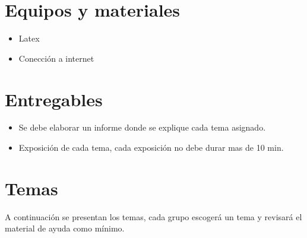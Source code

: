 \documentclass{article}
\begin{document}
	\section{Equipos y materiales}
	\begin{itemize}
		\item Latex
		\item Conección a internet 
	\end{itemize}
	
	\section{Entregables}
	\begin{itemize}
		\item Se debe elaborar un informe donde se explique cada tema asignado.
		\item Exposición de cada tema, cada exposición no debe durar mas de 10 min.
	\end{itemize}
	
	
	
	
	\clearpage
	
	
	\section{Temas}\label{sec:ejercicios}
	
	A continuación se presentan los temas, cada grupo escogerá un tema y revisará el material de ayuda como mínimo.
	
\end{document}
